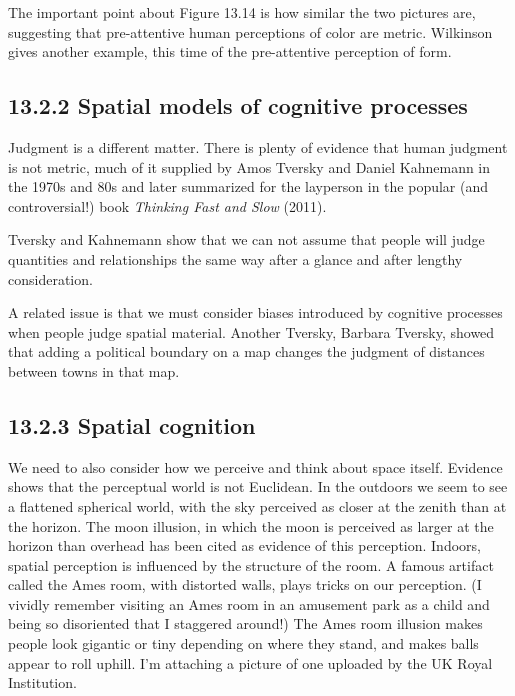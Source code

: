 The important point about Figure 13.14 is how similar the two pictures
are, suggesting that pre-attentive human perceptions of color are
metric. Wilkinson gives another example, this time of the pre-attentive
perception of form.

\hypertarget{spatial-models-of-cognitive-processes}{%
\subsection{13.2.2 Spatial models of cognitive
processes}\label{spatial-models-of-cognitive-processes}}

Judgment is a different matter. There is plenty of evidence that human
judgment is not metric, much of it supplied by Amos Tversky and Daniel
Kahnemann in the 1970s and 80s and later summarized for the layperson in
the popular (and controversial!) book \emph{Thinking Fast and Slow}
(2011).

Tversky and Kahnemann show that we can not assume that people will judge
quantities and relationships the same way after a glance and after
lengthy consideration.

A related issue is that we must consider biases introduced by cognitive
processes when people judge spatial material. Another Tversky, Barbara
Tversky, showed that adding a political boundary on a map changes the
judgment of distances between towns in that map.

\hypertarget{spatial-cognition}{%
\subsection{13.2.3 Spatial cognition}\label{spatial-cognition}}

We need to also consider how we perceive and think about space itself.
Evidence shows that the perceptual world is not Euclidean. In the
outdoors we seem to see a flattened spherical world, with the sky
perceived as closer at the zenith than at the horizon. The moon
illusion, in which the moon is perceived as larger at the horizon than
overhead has been cited as evidence of this perception. Indoors, spatial
perception is influenced by the structure of the room. A famous artifact
called the Ames room, with distorted walls, plays tricks on our
perception. (I vividly remember visiting an Ames room in an amusement
park as a child and being so disoriented that I staggered around!) The
Ames room illusion makes people look gigantic or tiny depending on where
they stand, and makes balls appear to roll uphill. I'm attaching a
picture of one uploaded by the UK Royal Institution.


